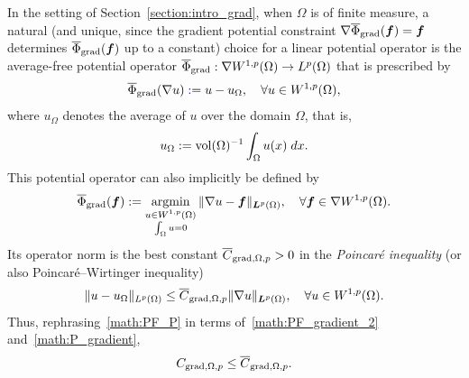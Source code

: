 \documentclass[10pt,a4paper]{article}
\newcommand\cye[1]{%
\protect\leavevmode
\begingroup
    \color{blue}%
    #1%
\endgroup
}
\begin{document}
\cye{In the setting of Section~\ref{section:intro_grad}, when $\Omega$ is of finite measure,} a natural \cye{(and unique, since the gradient potential constraint $\nabla \overline \Phi_{\operatorname{grad}}( \bm{f} ) = \bm{f}$ determines $\overline \Phi_{\operatorname{grad}}( \bm{f} )$ up to a constant)} choice \cye{for a linear potential operator} is the average-free potential operator $\overline\Phi_{\operatorname{grad}} : \nabla W^{1,p}(\Omega) \rightarrow L^{p}(\Omega)$ that is prescribed by
\begin{align*}
    \overline\Phi_{\grad}( \nabla u ) \cye{:}= u - u_{\Omega},
    \quad 
    \forall 
    u \in W^{1,p}(\Omega)
    ,
\end{align*}
where $u_\Omega$ denotes the average of $u$ over the domain $\Omega$, that is,
\begin{align*}
    u_{\Omega} := \operatorname{vol}(\Omega)^{-1} \int_{\Omega} u(x) \;dx.
\end{align*}
This potential operator can also implicitly be defined by
\begin{align*}
    \overline \Phi_{\operatorname{grad}}( \bm{f} ) 
    := 
    \operatorname*{{\rm argmin}}\limits_{ \substack{ u \in W^{1,p}(\Omega) \\ \int_\Omega u = 0 } } \| \nabla u - \bm{f} \|_{\bm{L}^{p}(\Omega)},
    \quad 
    \forall 
    \bm{f} \in \nabla W^{1,p}(\Omega)
    .
\end{align*} 
Its operator norm is the best constant $\overline C_{\operatorname{grad},\Omega,p} > 0$ in the {\em Poincar\'e inequality} (or also Poincar\'e--Wirtinger inequality)
\begin{align}\label{math:P_gradient}
    \| u - u_{\Omega} \|_{L^{p}(\Omega)}
    \leq 
    \overline C_{\operatorname{grad},\Omega,p} \| \nabla u \|_{\bm{L}^{p}(\Omega)},
    \quad 
    \forall 
    u \in W^{1,p}(\Omega)
    . 
\end{align}
Thus, rephrasing~\eqref{math:PF_P} in terms of~\eqref{math:PF_gradient_2} and~\eqref{math:P_gradient}, 
\begin{align*}
    C_{\operatorname{grad},\Omega,p} \leq \overline C_{\operatorname{grad},\Omega,p}.
\end{align*}
\end{document}
